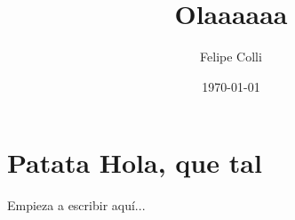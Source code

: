 \documentclass[11pt]{article}
\title{Olaaaaaa}
\author{Felipe Colli}
\date{\today}
\begin{document}
\maketitle
\thispagestyle{fancy}
\tableofcontents
\newpage


\section{Patata Hola, que tal}

Empieza a escribir aquí...
\end{document}

